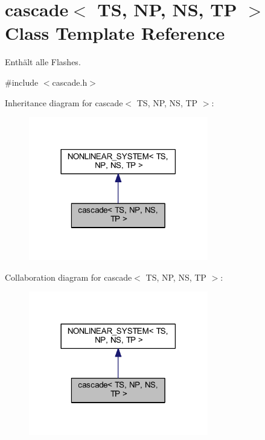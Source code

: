 \hypertarget{classcascade}{}\section{cascade$<$ TS, NP, NS, TP $>$ Class Template Reference}
\label{classcascade}


Enthält alle Flashes.  




{\ttfamily \#include $<$cascade.\+h$>$}



Inheritance diagram for cascade$<$ TS, NP, NS, TP $>$\+:\nopagebreak
\begin{figure}[H]
\begin{center}
\leavevmode
\includegraphics[width=222pt]{classcascade__inherit__graph}
\end{center}
\end{figure}


Collaboration diagram for cascade$<$ TS, NP, NS, TP $>$\+:\nopagebreak
\begin{figure}[H]
\begin{center}
\leavevmode
\includegraphics[width=222pt]{classcascade__coll__graph}
\end{center}
\end{figure}
